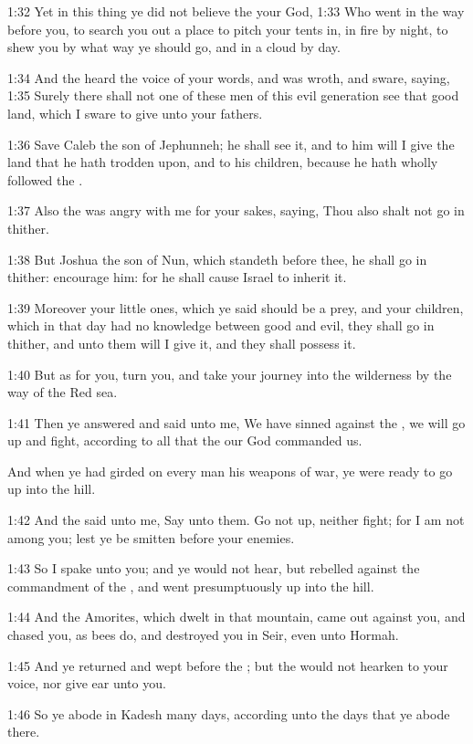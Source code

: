 1:32 Yet in this thing ye did not believe the \LORD your God, 1:33 Who went in the way before you, to search you out a place to pitch your tents in, in fire by night, to shew you by what way ye should go, and in a cloud by day.

1:34 And the \LORD heard the voice of your words, and was wroth, and sware, saying, 1:35 Surely there shall not one of these men of this evil generation see that good land, which I sware to give unto your fathers.

1:36 Save Caleb the son of Jephunneh; he shall see it, and to him will I give the land that he hath trodden upon, and to his children, because he hath wholly followed the \LORD.

1:37 Also the \LORD was angry with me for your sakes, saying, Thou also shalt not go in thither.

1:38 But Joshua the son of Nun, which standeth before thee, he shall go in thither: encourage him: for he shall cause Israel to inherit it.

1:39 Moreover your little ones, which ye said should be a prey, and your children, which in that day had no knowledge between good and evil, they shall go in thither, and unto them will I give it, and they shall possess it.

1:40 But as for you, turn you, and take your journey into the wilderness by the way of the Red sea.

1:41 Then ye answered and said unto me, We have sinned against the \LORD, we will go up and fight, according to all that the \LORD our God commanded us.

And when ye had girded on every man his weapons of war, ye were ready to go up into the hill.

1:42 And the \LORD said unto me, Say unto them. Go not up, neither fight; for I am not among you; lest ye be smitten before your enemies.

1:43 So I spake unto you; and ye would not hear, but rebelled against the commandment of the \LORD, and went presumptuously up into the hill.

1:44 And the Amorites, which dwelt in that mountain, came out against you, and chased you, as bees do, and destroyed you in Seir, even unto Hormah.

1:45 And ye returned and wept before the \LORD; but the \LORD would not hearken to your voice, nor give ear unto you.

1:46 So ye abode in Kadesh many days, according unto the days that ye abode there.

